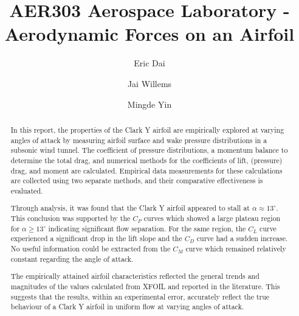 \documentclass[runningheads]{llncs}
\begin{document}
\title{AER303 Aerospace Laboratory - Aerodynamic Forces on an Airfoil}

\author{Eric Dai \and Jai Willems \and Mingde Yin}


\maketitle




\begin{abstract}

In this report, the properties of the Clark Y airfoil are empirically explored at varying angles of attack by measuring airfoil surface and wake pressure distributions in a subsonic wind tunnel. The coefficient of pressure distributions, a momentum balance to determine the total drag, and numerical methods for the coefficients of lift, (pressure) drag, and moment are calculated. Empirical data measurements for these calculations are collected using two separate methods, and their comparative effectiveness is evaluated.\newline

Through analysis, it was found that the Clark Y airfoil appeared to stall at $\alpha\approx 13^\circ$. This conclusion was supported by the $C_P$ curves which showed a large plateau region for $\alpha\geq13^\circ$ indicating significant flow separation. For the same region, the $C_L$ curve experienced a significant drop in the lift slope and the $C_D$ curve had a sudden increase. No useful information could be extracted from the $C_M$ curve which remained relatively constant regarding the angle of attack.\newline

The empirically attained airfoil characteristics reflected the general trends and magnitudes of the values calculated from XFOIL and reported in the literature. This suggests that the results, within an experimental error, accurately reflect the true behaviour of a Clark Y airfoil in uniform flow at varying angles of attack.

\end{abstract}
\end{document}
